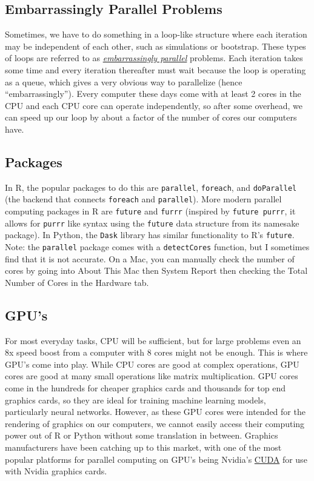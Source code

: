 \documentclass[
]{book}
\begin{document}
\subsection{Embarrassingly Parallel Problems}\label{embarrassingly-parallel-problems}

Sometimes, we have to do something in a loop-like structure where each iteration may be independent of each other, such as simulations or bootstrap. These types of loops are referred to as \href{https://en.wikipedia.org/wiki/Embarrassingly_parallel}{\emph{embarrassingly parallel}} problems. Each iteration takes some time and every iteration thereafter must wait because the loop is operating as a queue, which gives a very obvious way to parallelize (hence ``embarrassingly''). Every computer these days come with at least 2 cores in the CPU and each CPU core can operate independently, so after some overhead, we can speed up our loop by about a factor of the number of cores our computers have.

\subsection{Packages}\label{packages}

In R, the popular packages to do this are \texttt{parallel}, \texttt{foreach}, and \texttt{doParallel} (the backend that connects \texttt{foreach} and \texttt{parallel}). More modern parallel computing packages in R are \texttt{future} and \texttt{furrr} (inspired by \texttt{future\ purrr}, it allows for \texttt{purrr} like syntax using the \texttt{future} data structure from its namesake package). In Python, the \texttt{Dask} library has similar functionality to R's \texttt{future}. Note: the \texttt{parallel} package comes with a \texttt{detectCores} function, but I sometimes find that it is not accurate. On a Mac, you can manually check the number of cores by going into About This Mac then System Report then checking the Total Number of Cores in the Hardware tab.

\subsection{GPU's}\label{gpus}

For most everyday tasks, CPU will be sufficient, but for large problems even an 8x speed boost from a computer with 8 cores might not be enough. This is where GPU's come into play. While CPU cores are good at complex operations, GPU cores are good at many small operations like matrix multiplication. GPU cores come in the hundreds for cheaper graphics cards and thousands for top end graphics cards, so they are ideal for training machine learning models, particularly neural networks. However, as these GPU cores were intended for the rendering of graphics on our computers, we cannot easily access their computing power out of R or Python without some translation in between. Graphics manufacturers have been catching up to this market, with one of the most popular platforms for parallel computing on GPU's being Nvidia's \href{https://developer.nvidia.com/cuda-zone}{CUDA} for use with Nvidia graphics cards.
\end{document}
